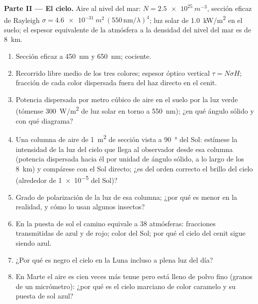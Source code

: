 \begin{problem}
\medskip
\noindent\textbf{Parte II --- El cielo.}
Aire al nivel del mar: $N = \qty{2.5e25}{m^{-3}}$, sección eficaz de Rayleigh $\sigma =
\qty{4.6e-31}{m^2}\,(550\,\text{nm}/\lambda)^4$; luz solar de \qty{1.0}{kW/m^2} en el
suelo; el espesor equivalente de la atmósfera a la densidad del nivel del mar es de
\qty{8}{km}.
\begin{enumerate}[resume]
  \item Sección eficaz a \qty{450}{nm} y \qty{650}{nm}; cociente.
  \item Recorrido libre medio de los tres colores; espesor óptico vertical
        $\tau = N\sigma H$; fracción de cada color dispersada fuera del
        haz directo en el cenit.
  \item Potencia dispersada por metro cúbico de aire en el suelo por
        la luz verde (tómense \qty{300}{W/m^2} de luz solar en torno a
        \qty{550}{nm}); ¿en qué ángulo sólido y con qué diagrama?
  \item Una columna de aire de \qty{1}{m^2} de sección vista a \qty{90}{\degree} del
        Sol: estímese la intensidad de la luz del cielo que llega al
        observador desde esa columna (potencia dispersada hacia él por
        unidad de ángulo sólido, a lo largo de los \qty{8}{km}) y compárese con el
        Sol directo; ¿es del orden correcto el brillo del cielo
        (alrededor de \qty{1e-5}{} del Sol)?
  \item Grado de polarización de la luz de esa columna; ¿por qué es
        menor en la realidad, y cómo lo usan algunos insectos?
  \item En la puesta de sol el camino equivale a $38$ atmósferas: fracciones transmitidas
        de azul y de rojo; color del Sol; por qué el cielo del cenit sigue
        siendo azul.
  \item ¿Por qué es negro el cielo en la Luna incluso a plena luz del día?
  \item En Marte el aire es cien veces más tenue pero está lleno de polvo
        fino (granos de un micrómetro): ¿por qué es el cielo marciano
        de color caramelo y su puesta de sol azul?
\end{enumerate}


\end{problem}
